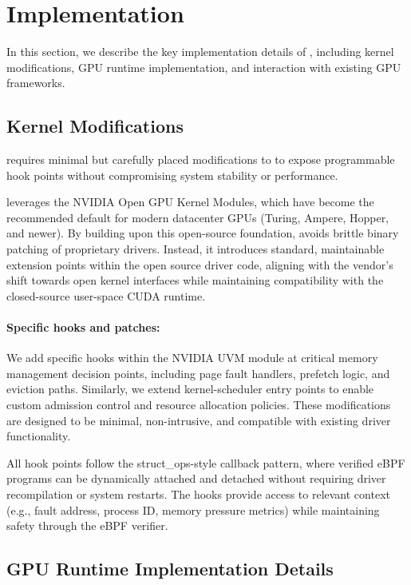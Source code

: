 
\section{\sys{} Implementation}

In this section, we describe the key implementation details of \sys, including kernel modifications, GPU runtime implementation, and interaction with existing GPU frameworks.
\label{sec:implementation}

\subsection{Kernel Modifications}

\sys requires minimal but carefully placed modifications to \sysdriver to expose programmable hook points without compromising system stability or performance.

\sys leverages the NVIDIA Open GPU Kernel Modules, which have become the recommended default for modern datacenter GPUs (Turing, Ampere, Hopper, and newer). By building upon this open-source foundation, \sys avoids brittle binary patching of proprietary drivers. Instead, it introduces standard, maintainable extension points within the open source driver code, aligning with the vendor's shift towards open kernel interfaces while maintaining compatibility with the closed-source user-space CUDA runtime.

\paragraph{Specific hooks and patches:}
We add specific hooks within the NVIDIA UVM module at critical memory management decision points, including page fault handlers, prefetch logic, and eviction paths. Similarly, we extend kernel-scheduler entry points to enable custom admission control and resource allocation policies. These modifications are designed to be minimal, non-intrusive, and compatible with existing driver functionality.

All hook points follow the struct\_ops-style callback pattern, where verified eBPF programs can be dynamically attached and detached without requiring driver recompilation or system restarts. The hooks provide access to relevant context (e.g., fault address, process ID, memory pressure metrics) while maintaining safety through the eBPF verifier.

\subsection{GPU Runtime Implementation Details}

